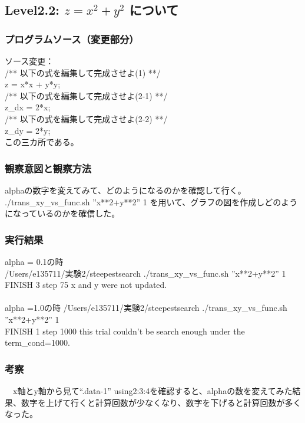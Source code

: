 \subsection{Level2.2: $z=x^2 + y^2$ について}
\subsubsection{プログラムソース（変更部分）}
ソース変更：\\
/** 以下の式を編集して完成させよ(1) **/\\
  z = x*x + y*y;\\
/** 以下の式を編集して完成させよ(2-1) **/\\
z_dx = 2*x;\\
/** 以下の式を編集して完成させよ(2-2) **/\\
z_dy = 2*y;\\
この三カ所である。\\
\subsubsection{観察意図と観察方法}
alphaの数字を変えてみて、どのようになるのかを確認して行く。\\
./trans_xy_vs_func.sh ''x**2+y**2'' 1 を用いて、グラフの図を作成しどのようになっているのかを確信した。\\
\subsubsection{実行結果}
alpha = 0.1の時\\
/Users/e135711/実験2/steepestsearch ./trans_xy_vs_func.sh ''x**2+y**2'' 1\\
FINISH 3 step 75 x and y were not updated.\\
\\
alpha =1.0の時
/Users/e135711/実験2/steepestsearch ./trans_xy_vs_func.sh ''x**2+y**2'' 1\\
FINISH 1 step 1000 this trial couldn't be search enough under the term_cond=1000.\\
\subsubsection{考察}
　x軸とy軸から見て“.data-1” using2:3:4を確認すると、alphaの数を変えてみた結果、数字を上げて行くと計算回数が少なくなり、数字を下げると計算回数が多くなった。\\
